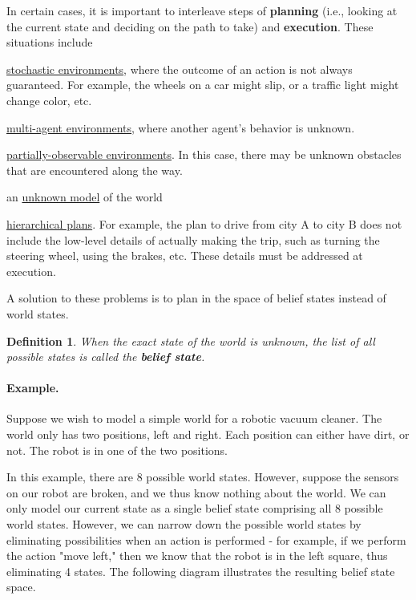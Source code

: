 \documentclass[10pt,a4paper]{article}
\newtheorem{defin}{Definition}
\newenvironment{itemize_packed}{
\begin{itemize}
\setlength{\itemsep}{0pt}
\setlength{\parskip}{0pt}
}{\end{itemize}}
\begin{document}
In certain cases, it is important to interleave steps of \textbf{planning} (i.e., looking at the current state and deciding on the path to take) and \textbf{execution}. These situations include
\begin{itemize_packed}
\item \underline{stochastic environments}, where the outcome of an action is not always guaranteed. For example, the wheels on a car might slip, or a traffic light might change color, etc.
\item \underline{multi-agent environments}, where another agent's behavior is unknown.
\item \underline{partially-observable environments}. In this case, there may be unknown obstacles that are encountered along the way.
\item an \underline{unknown model} of the world
\item \underline{hierarchical plans}. For example, the plan to drive from city A to city B does not include the low-level details of actually making the trip, such as turning the steering wheel, using the brakes, etc. These details must be addressed at execution.
\end{itemize_packed}
A solution to these problems is to plan in the space of belief states instead of world states.

\begin{defin}
When the exact state of the world is unknown, the list of all possible states is called the \emph{\textbf{belief state}}.
\end{defin}

\paragraph{Example.} Suppose we wish to model a simple world for a robotic vacuum cleaner. The world only has two positions, left and right. Each position can either have dirt, or not. The robot is in one of the two positions.

In this example, there are 8 possible world states. However, suppose the sensors on our robot are broken, and we thus know nothing about the world. We can only model our current state as a single belief state comprising all 8 possible world states. However, we can narrow down the possible world states by eliminating possibilities when an action is performed - for example, if we perform the action "move left," then we know that the robot is in the left square, thus eliminating 4 states. The following diagram illustrates the resulting belief state space.
\end{document}
